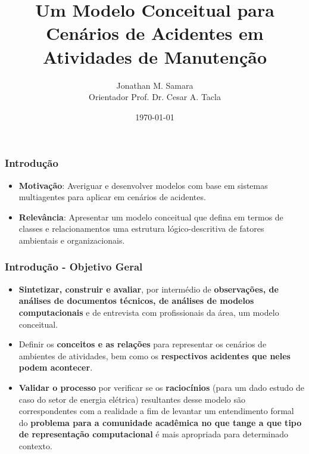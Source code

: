 \documentclass{beamer}
\title{Um Modelo Conceitual para Cenários de Acidentes em Atividades de Manutenção} %
\author{Jonathan M. Samara \\ Orientador Prof. Dr. Cesar A. Tacla} %
\institute[UTFPR] %
{
Universidade Tecnológica Federal do Paraná \\ %
\medskip
}
\date{\today} %
\begin{document}
\begin{frame}
\titlepage %
\end{frame}

\begin{frame}
\frametitle{Introdução} %
	\begin{itemize}
			\item \textbf{Motivação}: Averiguar e desenvolver modelos com base em sistemas multiagentes para aplicar em cenários de acidentes. 
			\item \textbf{Relevância}: Apresentar um modelo conceitual que defina em termos de classes e relacionamentos uma estrutura lógico-descritiva de fatores ambientais e organizacionais.    
	\end{itemize}
\end{frame}


\begin{frame}
\frametitle{Introdução - Objetivo Geral} %
	\begin{itemize}
		\item \textbf{Sintetizar, construir e avaliar}, por intermédio de \textbf{observações, de análises de documentos técnicos, de análises de modelos computacionais} e de entrevista com profissionais da área, um modelo conceitual.
		\item Definir os \textbf{conceitos e as relações} para representar os cenários de ambientes de atividades, bem como os \textbf{respectivos acidentes que neles podem acontecer}.
		\item \textbf{Validar o processo} por verificar se os \textbf{raciocínios} (para um dado estudo de caso do setor de energia elétrica) resultantes desse modelo são correspondentes com a realidade a fim de levantar um entendimento formal do \textbf{problema para a comunidade acadêmica no que tange a que tipo de representação computacional} é mais apropriada para determinado contexto. 
	\end{itemize}
\end{frame}
\end{document}

